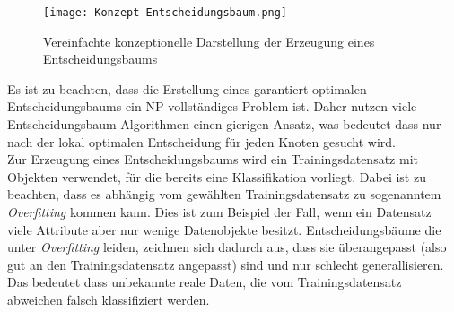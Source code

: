 \begin{figure}[htbp]
    \centering
    \texttt{[image: Konzept-Entscheidungsbaum.png]}
    \caption{Vereinfachte konzeptionelle Darstellung der Erzeugung eines Entscheidungsbaums \autocite{SebastianManteyPruning:online}}
\end{figure}

Es ist zu beachten, dass die Erstellung eines garantiert optimalen Entscheidungsbaums ein NP-vollständiges Problem ist. \autocite{NPComplete} Daher nutzen viele Entscheidungsbaum-Algorithmen einen gierigen Ansatz, was bedeutet dass nur nach der lokal optimalen Entscheidung für jeden Knoten gesucht wird. \autocite{DataMining}\\

Zur Erzeugung eines Entscheidungsbaums wird ein Trainingsdatensatz mit Objekten verwendet, für die bereits eine Klassifikation vorliegt. \autocite{Entschei47:online} Dabei ist zu beachten, dass es abhängig vom gewählten Trainingsdatensatz zu sogenanntem \textit{Overfitting} kommen kann. Dies ist zum Beispiel der Fall, wenn ein Datensatz viele Attribute aber nur wenige Datenobjekte besitzt. \autocite{PythonCourseDecisionTrees:online} Entscheidungsbäume die unter \textit{Overfitting} leiden, zeichnen sich dadurch aus, dass sie überangepasst (also gut an den Trainingsdatensatz angepasst) sind und nur schlecht generallisieren. Das bedeutet dass unbekannte reale Daten, die vom Trainingsdatensatz abweichen falsch klassifiziert werden. \autocite{DataMining}